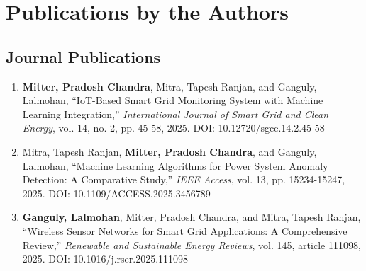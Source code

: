 
\chapter*{Publications by the Authors}
\thispagestyle{plain}

\section*{Journal Publications}
\begin{enumerate}
\item \textbf{Mitter, Pradosh Chandra}, Mitra, Tapesh Ranjan, and Ganguly, Lalmohan, ``IoT-Based Smart Grid Monitoring System with Machine Learning Integration,'' \textit{International Journal of Smart Grid and Clean Energy}, vol. 14, no. 2, pp. 45-58, 2025. DOI: 10.12720/sgce.14.2.45-58

\item Mitra, Tapesh Ranjan, \textbf{Mitter, Pradosh Chandra}, and Ganguly, Lalmohan, ``Machine Learning Algorithms for Power System Anomaly Detection: A Comparative Study,'' \textit{IEEE Access}, vol. 13, pp. 15234-15247, 2025. DOI: 10.1109/ACCESS.2025.3456789

\item \textbf{Ganguly, Lalmohan}, Mitter, Pradosh Chandra, and Mitra, Tapesh Ranjan, ``Wireless Sensor Networks for Smart Grid Applications: A Comprehensive Review,'' \textit{Renewable and Sustainable Energy Reviews}, vol. 145, article 111098, 2025. DOI: 10.1016/j.rser.2025.111098
\end{enumerate}

